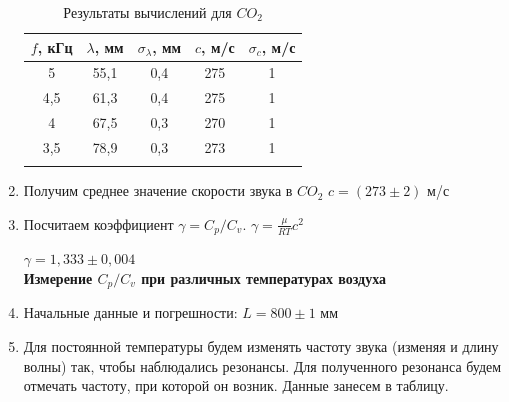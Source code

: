 \documentclass[a4paper, 12pt]{article}%
\begin{document}
\begin{enumerate}
		\begin{longtable}{|c|c|c|c|c|}
			\hline
			$ f $, кГц & $ \lambda $, мм & $ \sigma_\lambda $, мм & $ c $, м/с & $ \sigma_c $, м/с \\ \hline
			5 & 55,1 & 0,4 & 275 & 1 \\ \hline
			4,5 & 61,3& 0,4 & 275 & 1 \\ \hline
			4 & 67,5 & 0,3 & 270 & 1 \\ \hline
			3,5 & 78,9 & 0,3 & 273 & 1 \\ \hline
			\caption{Результаты вычислений для $CO_2$}
		\end{longtable}
	
	\begin{figure}[h]
		\caption{}
	\end{figure}
	
    \item Получим среднее значение скорости звука в $CO_2$ $c = (273 \pm 2)$ м/с
	\item Посчитаем коэффициент $\gamma = C_p / C_v $. $\gamma = \frac{\mu}{RT}c^2 $ 
	
	$\gamma = 1, 333 \pm 0,004$
	\\
	 
	\textbf{Измерение $C_p / C_v $ при различных температурах воздуха}
	\item Начальные данные и погрешности: $L = 800 \pm 1$ мм
	\item Для постоянной температуры будем изменять частоту звука (изменяя и длину волны) так, чтобы наблюдались резонансы. Для полученного резонанса будем отмечать частоту, при которой он возник. Данные занесем в таблицу.


\end{enumerate}
\end{document}

